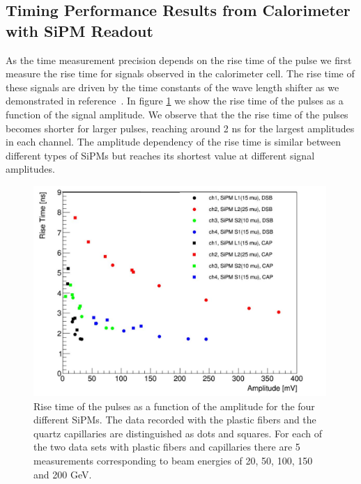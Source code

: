 \subsection{Timing Performance Results from Calorimeter with SiPM Readout}
\label{sec:beamtiming}

As the time measurement precision depends on the rise time of the pulse we first
measure the rise time for signals observed in the calorimeter cell. The rise
time of these signals are driven by the time constants of the wave length
shifter as we demonstrated in reference~\cite{lysotiming}. In figure
\ref{RiseTime} we show the rise time of the pulses as a function of the signal
amplitude. We observe that the the rise time of the pulses becomes shorter for larger pulses, 
reaching around 2 ns for the largest amplitudes in each channel. 
The amplitude dependency of the rise time is similar between different types of SiPMs but 
reaches its shortest value at different signal amplitudes. 

%
\begin{figure}[htb]
\includegraphics[width=0.99\textwidth]{RiseTime.pdf}
\caption{\label{RiseTime}Rise time of the pulses as a function of the amplitude
for the four different SiPMs. The data recorded with the plastic fibers and the
quartz capillaries are distinguished as dots and squares. For each of the two
data sets with plastic fibers and capillaries there are 5 measurements
corresponding to beam energies of 20, 50, 100, 150 and 200 GeV.}
\end{figure}
%

